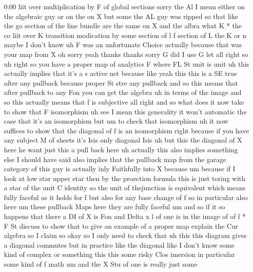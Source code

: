 \begin{unfinished}{0:00}
liit  over  multiplication  by  F  of  global
sections  sorry  the
Al  I  mean  either  on  the  algebraic  guy  or
on  the  on  X  but  some  the  AL  guy  was
ripped  so  that  like  the  go  section  of
the  line  bundle  are  the  same  on  X  and
the
albra  what  K
*  the  co  liit  over  K  transition
modication  by  some  section  of
l
f  section  of  L  the  K  or  n  maybe  I  don't
know
uh  F  was  an  unfortunate  Choice  actually
because  that  was  your  map  from  X  oh
sorry  yeah
thanks  thanks
sorry  G  did  I  use
G
let
all  right
so  uh  right  so  you  have  a  proper  map  of
analytics  F  where  FL  St  unit  is  unit  uh
this  actually  implies  that  it's  a  s
active  net  because  like  yeah  this  this
is  a  SE  true  after  any  pullback  because
proper  St  stre  any  pullback  and  so  this
means  that  after  pullback  to  any  Fon  you
can  get  the
algebra  uh  in  terms  of  the  image  and  so
this  actually  means  that  f  is
subjective  all  right  and  so  what  does  it
now  take  to  show  that  F
isomorphism  uh
see  I  mean  this  generality  it  won't
automatic  the  case  that  it's  an
isomorphism  but  um  to  check  that
isomorphism  uh
it  now  suffices  to  show  that  the
diagonal  of  f  is  an
isomorphism  right  because  if  you  have
any  subject  M  of  sheets  it's  Isis  only
diagonal
Isis  uh  but  this
the  diagonal  of  X
here
he  want  just  this  a  pull  back
here  uh  actually  this  also  implies
something  else  I  should  have
said  also  implies  that  the  pullback  map
from  the  garage  category
of  this  guy  is  actually  inly  Faithfully
into  X
because
um  because  if  I  look  at  low  star  upper
star  then  by  the  proection  formula  this
is  just  toring  with  a  star  of  the  unit
C  identity  so  the  unit  of  thejunction  is
equivalent  which  means  fully
faceful  as  it  holds  for  f  but  also  for
any  base  change  of  f  so  in  particular
also  here
um  these  pullback  Maps  here  they  are
fully  faceful  um  and
so  if  it  so  happens
that  there  a  DI
of
X  is
Fon  and  Delta  x
l  of  one  is  in  the
image  of  of  f  *  F
St  discuss  to  show  that  to  give  an
example  of  a  proper  map
explain  the  Cur
algebra  so  I  claim  so  okay  so  I  only
need  to  check  that  uh  this  this  diagram
gives  a  diagonal  commutes  but  in
practice  like  the  diagonal  like  I  don't
know  some  kind  of  complex  or  something
this  this  some  risky  Clos  imersion  in
particular  some  kind  of  f  math  um  and
the  X  Stu  of  one  is  really  just  some

\end{unfinished}
